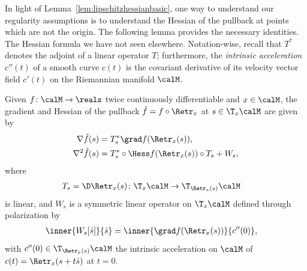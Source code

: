 In light of Lemma~\ref{lem:lipschitzhessianbasic}, one way to understand our regularity assumptions is to understand the Hessian of the pullback at points which are not the origin. The following lemma provides the necessary identities. The Hessian formula we have not seen elsewhere.
%
Notation-wise, recall that $T^*$ denotes the adjoint of a linear operator $T$; furthermore, the \emph{intrinsic acceleration} $c''(t)$ of a smooth curve $c(t)$ is the covariant derivative of its velocity vector field $c'(t)$ on the Riemannian manifold $\calM$.
\begin{lemma} \label{lem:derivativespullback}
	Given $f \colon \calM \to \reals$ twice continuously differentiable and $x \in \calM$, the gradient and Hessian of the pullback $\hat f = f \circ \Retr_x$ at $s \in \T_x\calM$ are given by
	\begin{align}
		\nabla \hat f(s) & = T_s^* \grad f(\Retr_x(s)), \label{eq:gradientpullback} \\
		\nabla^2 \hat f(s) & = T_s^* \circ \Hess f(\Retr_x(s)) \circ T_s + W_s,
		\label{eq:hessianpullback}
	\end{align}
	where
	\begin{align}
		T_s & = \D\Retr_x(s) \colon \T_{x}\calM \to \T_{\Retr_x(s)}\calM
		\label{eq:Ts}
	\end{align}
	is linear, and $W_s$ is a symmetric linear operator on $\T_x\calM$ defined through polarization by
	\begin{align}
		\inner{W_s[\dot s]}{\dot s} & = \inner{\grad f(\Retr_x(s))}{c''(0)},
		\label{eq:Whessianpullback}
	\end{align}
	with $c''(0) \in \T_{\Retr_x(s)}\calM$ the intrinsic acceleration on $\calM$ of $c(t) = \Retr_x(s+t\dot s)$ at $t = 0$.
\end{lemma}
